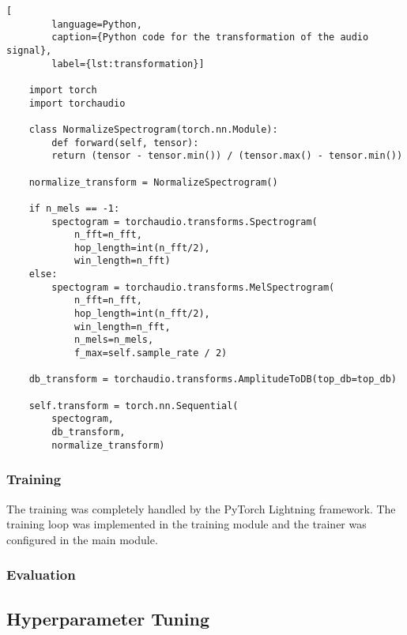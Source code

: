     \begin{lstlisting}[
        language=Python, 
        caption={Python code for the transformation of the audio signal}, 
        label={lst:transformation}]

    import torch
    import torchaudio

    class NormalizeSpectrogram(torch.nn.Module):
        def forward(self, tensor):
        return (tensor - tensor.min()) / (tensor.max() - tensor.min())

    normalize_transform = NormalizeSpectrogram()

    if n_mels == -1:
        spectogram = torchaudio.transforms.Spectrogram(
            n_fft=n_fft, 
            hop_length=int(n_fft/2), 
            win_length=n_fft)
    else:
        spectogram = torchaudio.transforms.MelSpectrogram(
            n_fft=n_fft,
            hop_length=int(n_fft/2),
            win_length=n_fft,
            n_mels=n_mels,
            f_max=self.sample_rate / 2)

    db_transform = torchaudio.transforms.AmplitudeToDB(top_db=top_db)

    self.transform = torch.nn.Sequential(
        spectogram, 
        db_transform, 
        normalize_transform)

    \end{lstlisting}


\subsubsection{Training}
The training was completely handled by the PyTorch Lightning framework. The training loop was
implemented in the training module and the trainer was configured in the main module. 

\subsubsection{Evaluation}


\subsection{Hyperparameter Tuning}